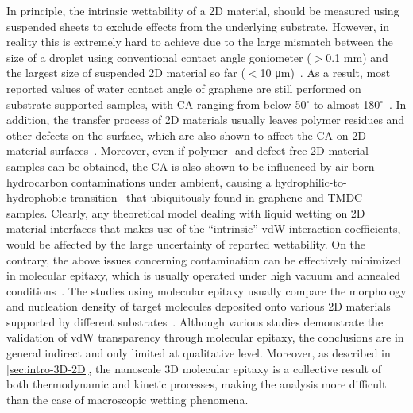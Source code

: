 %
In principle, the intrinsic wettability of a 2D material, should be
measured using suspended sheets to exclude effects from the underlying
substrate.
%
However, in reality this is extremely hard to achieve due to the large
mismatch between the size of a droplet using conventional contact
angle goniometer ($>$0.1 mm) and the largest size of suspended 2D
material so far ($<$10 μm)~\cite{Zhang_2017_transfer_suspended}.
%
As a result, most reported values of water contact angle of graphene
are still performed on substrate-supported samples, with CA ranging
from below 50$^{\circ}$ to almost 180$^{\circ}$~\cite{kozbial_study_2014}.
%
In addition, the transfer process of 2D materials usually leaves
polymer residues and other defects on the surface, which are also
shown to affect the CA on 2D material surfaces~\cite{Kozbial_2015}.
%
Moreover, even if polymer- and defect-free 2D material samples can be
obtained, the CA is also shown to be influenced by air-born
hydrocarbon contaminations under ambient, causing a
hydrophilic-to-hydrophobic transition~\cite{li_effect_2013} that ubiquitously found in graphene and
TMDC samples.
%
Clearly, any theoretical model dealing with liquid wetting on 2D
material interfaces that makes use of the ``intrinsic'' vdW
interaction coefficients, would be affected by the
large uncertainty of reported wettability.
%
On the contrary, the above issues concerning contamination can be
effectively minimized in molecular epitaxy, which is usually operated
under high vacuum and annealed conditions~\cite{Koma_1985_vdWE}.
%
%
The studies using molecular epitaxy usually compare the morphology and
nucleation density of target molecules deposited onto various 2D
materials supported by different substrates~\cite{Kratzer_2016_6P_gr_trans,Nguyen_2015_pent_gr_wett}.
%
Although various studies demonstrate the validation of vdW
transparency through molecular epitaxy, the conclusions are in general
indirect and only limited at qualitative level.
%
Moreover, as described in \autoref{sec:intro-3D-2D}, the nanoscale 3D
molecular epitaxy is a collective result of both thermodynamic and
kinetic processes, making the analysis more difficult than the case of
macroscopic wetting phenomena.


